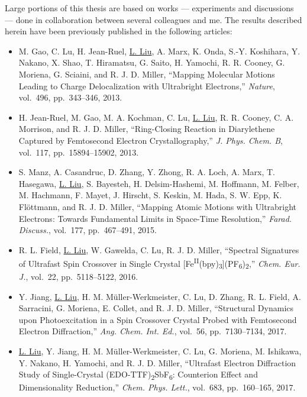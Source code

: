 Large portions of this thesis are based on works --- experiments and discussions ---
done in collaboration between several colleagues and me.
The results described herein have been previously published in the following articles:
%
\begin{itemize}
  \item M. Gao, C. Lu, H. Jean-Ruel, \underline{L. Liu}, A. Marx, K. Onda, S.-Y. Koshihara,
    Y. Nakano, X. Shao, T. Hiramatsu, G. Saito, H. Yamochi, R. R. Cooney, G. Moriena, G. Sciaini,
    and R. J. D. Miller,
    ``Mapping Molecular Motions Leading to Charge Delocalization with Ultrabright Electrons,''
    \textit{Nature}, vol.~496, pp.~343--346, 2013.

  \item H. Jean-Ruel, M. Gao, M. A. Kochman, C. Lu, \underline{L. Liu}, R. R. Cooney,
    C. A. Morrison, and R. J. D. Miller,
    ``Ring-Closing Reaction in Diarylethene Captured by Femtosecond Electron Crystallography,''
    \textit{J. Phys. Chem. B}, vol.~117, pp.~15894--15902, 2013.

  \item S. Manz, A. Casandruc, D. Zhang, Y. Zhong, R. A. Loch, A. Marx, T. Hasegawa,
    \underline{L. Liu}, S. Bayesteh, H. Delsim-Hashemi, M. Hoffmann, M. Felber, M. Hachmann,
    F. Mayet, J. Hirscht, S. Keskin, M. Hada, S. W. Epp, K. Fl\"{o}ttmann, and R. J. D. Miller,
    ``Mapping Atomic Motions with Ultrabright Electrons: Towards Fundamental Limits in Space-Time
    Resolution,'' \textit{Farad. Discuss.}, vol.~177, pp.~467--491, 2015.

  \item R. L. Field, \underline{L. Liu}, W. Gawelda, C. Lu, R. J. D. Miller,
    ``Spectral Signatures of Ultrafast Spin Crossover in Single Crystal
    [Fe\textsuperscript{II}(bpy)\textsubscript{3}](PF\textsubscript{6})\textsubscript{2},''
    \textit{Chem. Eur. J.}, vol.~22, pp.~5118--5122, 2016.

  \item Y. Jiang, \underline{L. Liu}, H. M. M\"{u}ller-Werkmeister, C. Lu, D. Zhang, R. L. Field,
    A. Sarracini, G. Moriena, E. Collet, and R. J. D. Miller,
    ``Structural Dynamics upon Photoexcitation in a Spin Crossover Crystal Probed
    with Femtosecond Electron Diffraction,''
    \textit{Ang. Chem. Int. Ed.}, vol.~56, pp.~7130--7134, 2017.

  \item \underline{L. Liu}, Y. Jiang, H. M. M\"{u}ller-Werkmeister, C. Lu, G. Moriena,
    M. Ishikawa, Y. Nakano, H. Yamochi, and R. J. D. Miller,
    ``Ultrafast Electron Diffraction Study of Single-Crystal
    (EDO-TTF)\textsubscript{2}SbF\textsubscript{6}: Counterion Effect and Dimensionality Reduction,''
    \textit{Chem. Phys. Lett.}, vol.~683, pp.~160--165, 2017.


\end{itemize}
